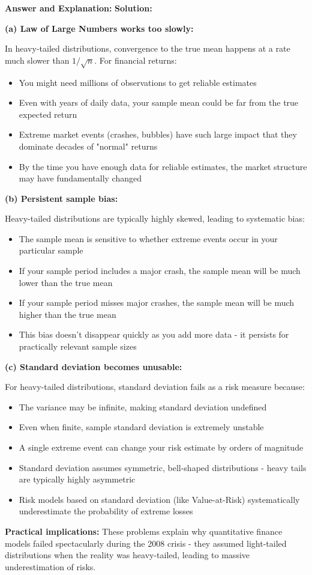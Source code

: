 \documentclass[11pt]{article}
\newenvironment{answer}{\color{answercolor}\begin{framed}\textbf{Answer and Explanation:}}{\end{framed}}
\begin{document}
\begin{answer}
\textbf{Solution:}

\textbf{(a) Law of Large Numbers works too slowly:}

In heavy-tailed distributions, convergence to the true mean happens at a rate much slower than $1/\sqrt{n}$. For financial returns:
\begin{itemize}
    \item You might need millions of observations to get reliable estimates
    \item Even with years of daily data, your sample mean could be far from the true expected return
    \item Extreme market events (crashes, bubbles) have such large impact that they dominate decades of "normal" returns
    \item By the time you have enough data for reliable estimates, the market structure may have fundamentally changed
\end{itemize}

\textbf{(b) Persistent sample bias:}

Heavy-tailed distributions are typically highly skewed, leading to systematic bias:
\begin{itemize}
    \item The sample mean is sensitive to whether extreme events occur in your particular sample
    \item If your sample period includes a major crash, the sample mean will be much lower than the true mean
    \item If your sample period misses major crashes, the sample mean will be much higher than the true mean
    \item This bias doesn't disappear quickly as you add more data - it persists for practically relevant sample sizes
\end{itemize}

\textbf{(c) Standard deviation becomes unusable:}

For heavy-tailed distributions, standard deviation fails as a risk measure because:
\begin{itemize}
    \item The variance may be infinite, making standard deviation undefined
    \item Even when finite, sample standard deviation is extremely unstable
    \item A single extreme event can change your risk estimate by orders of magnitude
    \item Standard deviation assumes symmetric, bell-shaped distributions - heavy tails are typically highly asymmetric
    \item Risk models based on standard deviation (like Value-at-Risk) systematically underestimate the probability of extreme losses
\end{itemize}

\textbf{Practical implications:} These problems explain why quantitative finance models failed spectacularly during the 2008 crisis - they assumed light-tailed distributions when the reality was heavy-tailed, leading to massive underestimation of risks.
\end{answer}
\end{document}
